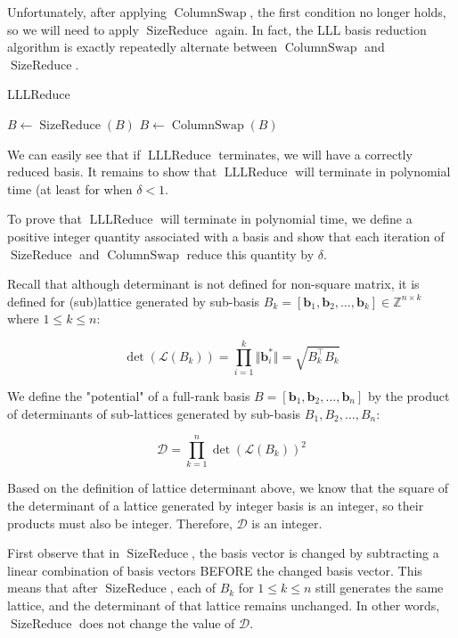 Unfortunately, after applying $\operatorname{ColumnSwap}$, the first condition no longer holds, so we will need to apply $\operatorname{SizeReduce}$ again. In fact, the LLL basis reduction algorithm is exactly repeatedly alternate between $\operatorname{ColumnSwap}$ and $\operatorname{SizeReduce}$.

\begin{algorithm}
\caption{LLLReduce}
\begin{algorithmic}[1]
        \State $B \leftarrow \operatorname{SizeReduce}(B)$
        \State $B \leftarrow \operatorname{ColumnSwap}(B)$
    \EndWhile
\end{algorithmic}
\end{algorithm}

We can easily see that if $\operatorname{LLLReduce}$ terminates, we will have a correctly reduced basis. It remains to show that $\operatorname{LLLReduce}$ will terminate in polynomial time (at least for when $\delta < 1$.

To prove that $\operatorname{LLLReduce}$ will terminate in polynomial time, we define a positive integer quantity associated with a basis and show that each iteration of $\operatorname{SizeReduce}$ and $\operatorname{ColumnSwap}$ reduce this quantity by $\delta$.

Recall that although determinant is not defined for non-square matrix, it is defined for (sub)lattice generated by sub-basis $B_k = [\mathbf{b}_1, \mathbf{b}_2, \ldots, \mathbf{b}_k] \in \mathbb{Z}^{n \times k}$ where $1 \leq k \leq n$:

$$
\det(\mathcal{L}(B_k)) = \prod_{i=1}^k \Vert \mathbf{b}_i^\ast \Vert = \sqrt{B_k^\intercal B_k}
$$

We define the "potential" of a full-rank basis $B = [\mathbf{b}_1, \mathbf{b}_2, \ldots, \mathbf{b}_n]$ by the product of determinants of sub-lattices generated by sub-basis $B_1, B_2, \ldots, B_n$:

$$
\mathcal{D} = \prod_{k=1}^n \det(\mathcal{L}(B_k))^2
$$

Based on the definition of lattice determinant above, we know that the square of the determinant of a lattice generated by integer basis is an integer, so their products must also be integer. Therefore, $\mathcal{D}$ is an integer.

First observe that in $\operatorname{SizeReduce}$, the basis vector is changed by subtracting a linear combination of basis vectors BEFORE the changed basis vector. This means that after $\operatorname{SizeReduce}$, each of $B_k$ for $1\leq k \leq n$ still generates the same lattice, and the determinant of that lattice remains unchanged. In other words, $\operatorname{SizeReduce}$ does not change the value of $\mathcal{D}$.


